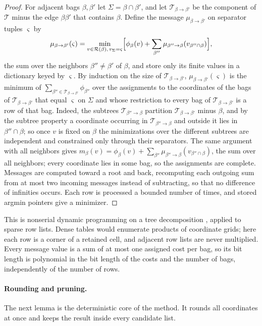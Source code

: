 \begin{proof}
For adjacent bags $\beta,\beta'$ let $\Sigma=\beta\cap\beta'$, and let
$\mathcal T_{\beta\to\beta'}$ be the component of $\mathcal T$ minus the edge
$\beta\beta'$ that contains $\beta$. Define the message
$\mu_{\beta\to\beta'}$ on separator tuples $\varsigma$ by
\[
 \mu_{\beta\to\beta'}(\varsigma)=\min_{v\in\mathcal R(\beta),\,v_\Sigma=\varsigma}
 \Bigl[\phi_\beta(v)+\sum_{\beta''}\mu_{\beta''\to\beta}(v_{\beta''\cap\beta})\Bigr],
\]
the sum over the neighbors $\beta''\ne\beta'$ of $\beta$, and store only its
finite values in a dictionary keyed by $\varsigma$. By induction on the size
of $\mathcal T_{\beta\to\beta'}$, $\mu_{\beta\to\beta'}(\varsigma)$ is the
minimum of $\sum_{\beta''\in\mathcal T_{\beta\to\beta'}}\phi_{\beta''}$ over
the assignments to the coordinates of the bags of
$\mathcal T_{\beta\to\beta'}$ that equal $\varsigma$ on $\Sigma$ and whose
restriction to every bag of $\mathcal T_{\beta\to\beta'}$ is a row of that
bag. Indeed, the subtrees $\mathcal T_{\beta''\to\beta}$ partition
$\mathcal T_{\beta\to\beta'}$ minus $\beta$, and by the subtree property a
coordinate occurring in $\mathcal T_{\beta''\to\beta}$ and outside it lies in
$\beta''\cap\beta$; so once $v$ is fixed on $\beta$ the minimizations over
the different subtrees are independent and constrained only through their
separators. The same argument with all neighbors gives
$m_\beta(v)=\phi_\beta(v)+\sum_{\beta''}\mu_{\beta''\to\beta}(v_{\beta''\cap\beta})$,
the sum over all neighbors; every coordinate lies in some bag, so the
assignments are complete. Messages are computed toward a root and back,
recomputing each outgoing sum from at most two incoming messages instead of
subtracting, so that no difference of infinities occurs. Each row is
processed a bounded number of times, and stored argmin pointers give a
minimizer.
\end{proof}

This is nonserial dynamic programming on a tree decomposition
\citep{bertele1972-nonserial-dynamic-programming}, applied to sparse row lists. Dense tables
would enumerate products of coordinate grids; here each row is a corner of a
retained cell, and adjacent row lists are never multiplied. Every message
value is a sum of at most one assigned cost per bag, so its bit length is
polynomial in the bit length of the costs and the number of bags,
independently of the number of rows.

\paragraph{Rounding and pruning.}
The next lemma is the deterministic core of the method. It rounds all
coordinates at once and keeps the result inside every candidate list.

